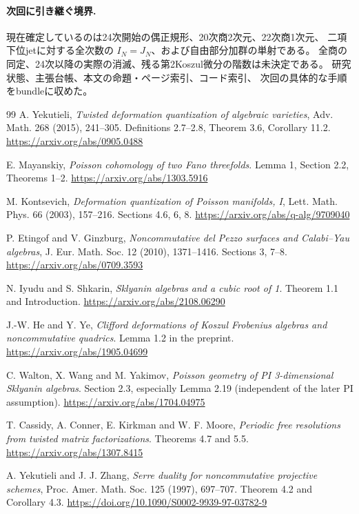 \documentclass[a4paper,11pt]{ltjsarticle}
\theoremstyle{definition}
\begin{document}
\paragraph{次回に引き継ぐ境界.}
現在確定しているのは24次開始の偶正規形、20次商2次元、22次商1次元、
二項下位jetに対する全次数の $I_N=J_N$、および自由部分加群の単射である。
全商の同定、24次以降の実際の消滅、残る第2Koszul微分の階数は未決定である。
研究状態、主張台帳、本文の命題・ページ索引、コード索引、
次回の具体的な手順をbundleに収めた。


\begin{thebibliography}{99}
\small
{}
A. Yekutieli,
\emph{Twisted deformation quantization of algebraic varieties},
Adv. Math. 268 (2015), 241--305.
Definitions 2.7--2.8, Theorem 3.6, Corollary 11.2.
\url{https://arxiv.org/abs/0905.0488}

E. Mayanskiy,
\emph{Poisson cohomology of two Fano threefolds}.
Lemma 1, Section 2.2, Theorems 1--2.
\url{https://arxiv.org/abs/1303.5916}

M. Kontsevich,
\emph{Deformation quantization of Poisson manifolds, I},
Lett. Math. Phys. 66 (2003), 157--216.
Sections 4.6, 6, 8.
\url{https://arxiv.org/abs/q-alg/9709040}

P. Etingof and V. Ginzburg,
\emph{Noncommutative del Pezzo surfaces and Calabi--Yau algebras},
J. Eur. Math. Soc. 12 (2010), 1371--1416.
Sections 3, 7--8.
\url{https://arxiv.org/abs/0709.3593}

N. Iyudu and S. Shkarin,
\emph{Sklyanin algebras and a cubic root of 1}.
Theorem 1.1 and Introduction.
\url{https://arxiv.org/abs/2108.06290}

J.-W. He and Y. Ye,
\emph{Clifford deformations of Koszul Frobenius algebras and noncommutative quadrics}.
Lemma 1.2 in the preprint.
\url{https://arxiv.org/abs/1905.04699}

C. Walton, X. Wang and M. Yakimov,
\emph{Poisson geometry of PI 3-dimensional Sklyanin algebras}.
Section 2.3, especially Lemma 2.19 (independent of the later PI assumption).
\url{https://arxiv.org/abs/1704.04975}

T. Cassidy, A. Conner, E. Kirkman and W. F. Moore,
\emph{Periodic free resolutions from twisted matrix factorizations}.
Theorems 4.7 and 5.5.
\url{https://arxiv.org/abs/1307.8415}

A. Yekutieli and J. J. Zhang,
\emph{Serre duality for noncommutative projective schemes},
Proc. Amer. Math. Soc. 125 (1997), 697--707.
Theorem 4.2 and Corollary 4.3.
\url{https://doi.org/10.1090/S0002-9939-97-03782-9}


\end{thebibliography}
\end{document}
